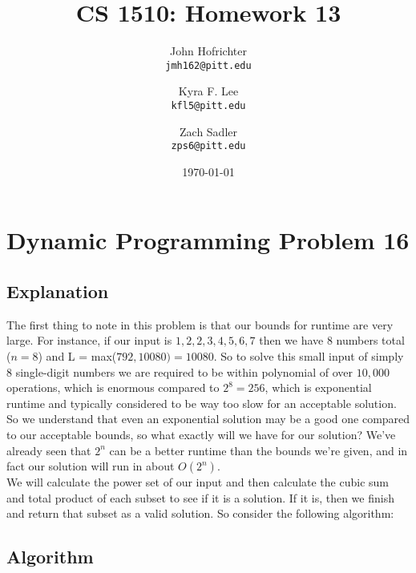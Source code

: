 \documentclass[12pt]{article}
\title{CS 1510: Homework 13}
\author{
John Hofrichter\\\texttt{jmh162@pitt.edu}
\and
Kyra F. Lee \\\texttt{kfl5@pitt.edu}
\and
Zach Sadler \\\texttt{zps6@pitt.edu}}
\date{\today}
\begin{document}
\maketitle
\section*{Dynamic Programming Problem 16}
	\subsection*{Explanation}
	
The first thing to note in this problem is that our bounds for runtime are very large. For instance, if our input is $1, 2, 2, 3, 4, 5, 6, 7$ then we have 8 numbers total ($n = 8$) and L = max($792, 10080) = 10080$. So to solve this small input of simply 8 single-digit numbers we are required to be within polynomial of over $10,000$ operations, which is enormous compared to $2^8 = 256$, which is exponential runtime and typically considered to be way too slow for an acceptable solution.\\
So we understand that even an exponential solution may be a good one compared to our acceptable bounds, so what exactly will we have for our solution? We've already seen that $2^n$ can be a better runtime than the bounds we're given, and in fact our solution will run in about $O(2^n)$.\\
We will calculate the power set of our input and then calculate the cubic sum and total product of each subset to see if it is a solution. If it is, then we finish and return that subset as a valid solution. So consider the following algorithm:\\

	\subsection*{Algorithm}
	
\begin{algorithmic}
		\ENDFOR
	\ENDFOR
		\ENDIF
	\ENDFOR
\end{algorithmic}	
\end{document}
